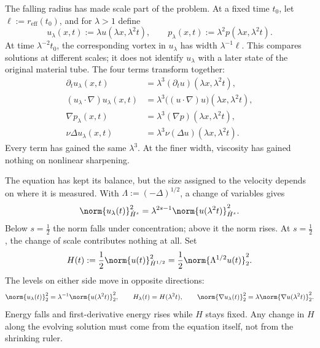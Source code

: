 
The falling radius has made scale part of the problem.
At a fixed time \(t_0\), let \(\ell:=r_{\mathrm{eff}}(t_0)\), and for \(\lambda>1\) define
\[
  u_\lambda(x,t)
  :=
  \lambda u(\lambda x,\lambda^2t),
  \qquad
  p_\lambda(x,t)
  :=
  \lambda^2p(\lambda x,\lambda^2t).
\]
At time \(\lambda^{-2}t_0\), the corresponding vortex in \(u_\lambda\) has width \(\lambda^{-1}\ell\).
This compares solutions at different scales; it does not identify \(u_\lambda\) with a later state of the original material tube.
The four terms transform together:
\[
\begin{aligned}
  \partial_tu_\lambda(x,t)
  &=
  \lambda^3(\partial_tu)(\lambda x,\lambda^2t),
  \\
  (u_\lambda\cdot\nabla)u_\lambda(x,t)
  &=
  \lambda^3\bigl((u\cdot\nabla)u\bigr)(\lambda x,\lambda^2t),
  \\
  \nabla p_\lambda(x,t)
  &=
  \lambda^3(\nabla p)(\lambda x,\lambda^2t),
  \\
  \nu\Delta u_\lambda(x,t)
  &=
  \lambda^3\nu(\Delta u)(\lambda x,\lambda^2t).
\end{aligned}
\]
Every term has gained the same \(\lambda^3\).
At the finer width, viscosity has gained nothing on nonlinear sharpening.


The equation has kept its balance, but the size assigned to the velocity depends on where it is measured.
With \(\Lambda:=(-\Delta)^{1/2}\), a change of variables gives
\[
  \norm{u_\lambda(t)}_{\dot H^s}^2
  =
  \lambda^{2s-1}
  \norm{u(\lambda^2t)}_{\dot H^s}^2.
\]
Below \(s=\tfrac12\) the norm falls under concentration; above it the norm rises.
At \(s=\tfrac12\), the change of scale contributes nothing at all.
Set
\[
  H(t)
  :=
  \frac12\norm{u(t)}_{\dot H^{1/2}}^2
  =
  \frac12\norm{\Lambda^{1/2}u(t)}_2^2.
\]
The levels on either side move in opposite directions:
\[
  \norm{u_\lambda(t)}_2^2
  =
  \lambda^{-1}\norm{u(\lambda^2t)}_2^2,
  \qquad
  H_\lambda(t)=H(\lambda^2t),
  \qquad
  \norm{\nabla u_\lambda(t)}_2^2
  =
  \lambda\norm{\nabla u(\lambda^2t)}_2^2.
\]
Energy falls and first-derivative energy rises while \(H\) stays fixed.
Any change in \(H\) along the evolving solution must come from the equation itself, not from the shrinking ruler.


